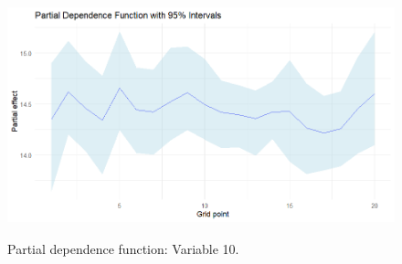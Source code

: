 \begin{enumerate}[leftmargin=*]
\begin{figure}[!h]
	\includegraphics[width=340pt, height=200pt]{Chapters/chapter13/figures/Partial10.png}
	\caption[List of figure caption goes here]{Partial dependence function: Variable 10.}\label{figPartial10}
\end{figure}

\end{enumerate}